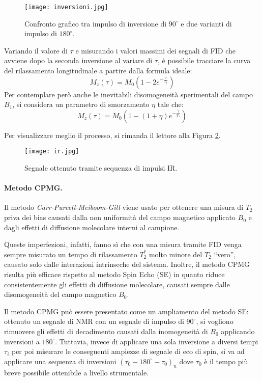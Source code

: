 \begin{figure}
\centering
\texttt{[image: inversioni.jpg]}
\caption{Confronto grafico tra impulso di inversione di $90^{\circ}$ e due varianti di impulso di $180^{\circ}$. \cite{website}}
\label{fig:inversioni}
\end{figure}  
\newpage
Variando il valore di $\tau$ e misurando i valori massimi dei segnali di FID che avviene dopo la seconda inversione al variare di $\tau$, è possibile tracciare la curva del rilassamento longitudinale a partire dalla formula ideale:
\begin{equation}
	M_z(\tau)=M_0\left(1 - 2e^{-\frac{\tau}{T_1}}\right)
\end{equation}
Per contemplare però anche le inevitabili disomogeneità sperimentali del campo $B_1$, si considera un parametro di smorzamento $\eta$ tale che:
\begin{equation}
	M_z(\tau)=M_0\left(1 - (1+\eta)e^{-\frac{\tau}{T_1}}\right)
\end{equation}

Per visualizzare meglio il processo, si rimanda il lettore alla Figura \ref{fig:ir}.

\begin{figure}
\centering
\texttt{[image: ir.jpg]}
\caption{Segnale ottenuto tramite sequenza di impulsi IR.\cite{website}}\label{fig:ir}
\end{figure}

\paragraph{Metodo CPMG.}

Il metodo \textit{Carr-Purcell-Meiboom-Gill} viene usato per ottenere una misura di $T_2$ priva dei bias causati dalla non uniformità del campo magnetico applicato $B_0$ e dagli effetti di diffusione molecolare interni al campione.

Queste imperfezioni, infatti, fanno sì che con una misura tramite FID venga sempre misurato un tempo di rilassamento $T_2^*$ molto minore del $T_2$ ``vero'', causato solo dalle interazioni intrinseche del sistema. Inoltre, il metodo CPMG risulta più efficace rispetto al metodo Spin Echo (SE) in quanto riduce consistentemente gli effetti di diffusione molecolare, causati sempre dalle disomogeneità del campo magnetico $B_0$.

Il metodo CPMG può essere presentato come un ampliamento del metodo SE: ottenuto un segnale di NMR con un segnale di impulso di $90^\circ$, si vogliono rimuovere gli effetti di decadimento causati dalla inomogeneità di $B_0$ applicando inversioni a $180^\circ$. Tuttavia, invece di applicare una sola inversione a diversi tempi $\tau_i$ per poi misurare le conseguenti ampiezze di segnale di eco di spin, si va ad applicare una sequenza di inversioni $(\tau_0 - 180^\circ - \tau_0)_n$ dove $\tau_0$ è il tempo più breve possibile ottenibile a livello strumentale.\\

